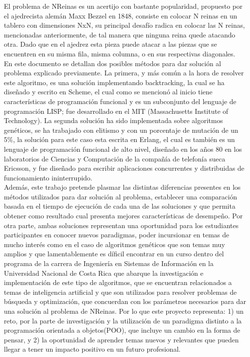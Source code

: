 \documentclass[12pt,a4paper]{article}
\begin{document}
 	El problema de NReinas es un acertijo con bastante popularidad, propuesto por el ajedrecista alemán Maxx Bezzel en 1848, consiste en colocar N reinas en un tablero con dimensiones NxN, su principal desafío radica en colocar las N reinas, mencionadas anteriormente, de tal manera que ninguna reina quede atacando otra. Dado que en el ajedrez esta pieza puede atacar a las piezas que se encuentren en su misma fila, misma columna, o en sus respectivas diagonales. \\
 	
 	En este documento se detallan dos posibles métodos para dar solución al problema explicado previamente. La primera, y más común a la hora de resolver este algoritmo, es una solución implementando backtracking, la cual se ha diseñado y escrito en Scheme, el cual como se mencionó al inicio tiene características de programación funcional y es un subconjunto del lenguaje de programación LISP; fue desarrollado en el MIT (Massachusetts Institute of Technology). La segunda solución ha sido implementada sobre algoritmos genéticos, se ha trabajado con elitismo y con un porcentaje de mutación de un 5\%, la solución para este caso esta escrita en Erlang, el cual es también es un lenguaje de programación funcional de alto nivel, diseñado en los años 80 en los laboratorios de Ciencias y Computación de la compañía de telefonía sueca Ericsson, y fue diseñado para escribir aplicaciones concurrentes y distribuidas de funcionamiento ininterrupido. \\
 	
 	Además, este trabajo pretende plasmar las distintas diferencias presentes en los métodos utilizados para dar solución al problema, establecer una comparación basada en el tiempo de ejecución de cada una de las soluciones y que permita obtener como resultado cual presenta mejores características de desempeño. Por otra parte, ambas soluciones representan una oportunidad para los estudiantes participantes en conocer nuevos paradigmas, poder incursionar en temas de mucho interés como en el caso de algoritmos genéticos que  son temas muy amplios y que lamentablemente es díficil encontrar en un curso dentro del programa de la carrera de Ingeniería en Sistemas de Información en la Universidad Nacional de Costa Rica que abarque la investigación e implementación de este tipo de algoritmos, que se encuentran relacionados a temas de inteligencia artificial y que son utilizados para resolver problemas de búsqueda y optimización, que concuerdan con los parámetros necesarios para dar una solución al problema de NReinas. Por lo que este proyecto representa: 1) un reto, por la parte de investigación y la utilización de un paradigma distinto a la programación orientada a objetos(POO), que incluye un cambio en la forma de pensar, y 2) la oportunidad de aprender temas nuevos y relevantes que pueden llegar a tener un impacto positivo en un futuro profesional. \\
 	
\end{document}
